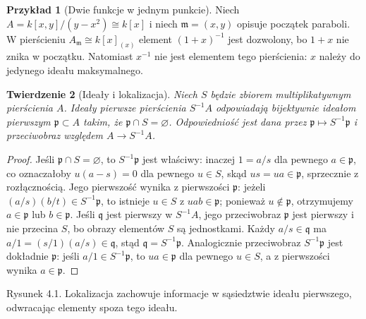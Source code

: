 \documentclass[11pt,a4paper,openany]{report}
\numberwithin{equation}{section}
\theoremstyle{plain}
\newtheorem{twierdzenie}{Twierdzenie}[section]
\theoremstyle{definition}
\newtheorem{przyklad}[twierdzenie]{Przykład}
\theoremstyle{remark}
\begin{document}
\begin{przyklad}[Dwie funkcje w jednym punkcie]
Niech $A=k[x,y]/(y-x^2)\cong k[x]$ i niech
$\mathfrak m=(x,y)$ opisuje początek paraboli.
W pierścieniu $A_{\mathfrak m}\cong k[x]_{(x)}$
element $(1+x)^{-1}$ jest dozwolony, bo $1+x$
nie znika w początku. Natomiast $x^{-1}$
nie jest elementem tego pierścienia: $x$ należy
do jedynego ideału maksymalnego.
\end{przyklad}

\begin{twierdzenie}[Ideały i lokalizacja]
\label{tw:idealy-loc}
Niech $S$ będzie zbiorem multiplikatywnym pierścienia $A$.
Ideały pierwsze pierścienia $S^{-1}A$ odpowiadają
bijektywnie ideałom pierwszym $\mathfrak p\subset A$
takim, że $\mathfrak p\cap S=\varnothing$.
Odpowiedniość jest dana przez
$\mathfrak p\mapsto S^{-1}\mathfrak p$ i przeciwobraz
względem $A\to S^{-1}A$.
\end{twierdzenie}
\begin{proof}
Jeśli $\mathfrak p\cap S=\varnothing$, to
$S^{-1}\mathfrak p$ jest właściwy: inaczej $1=a/s$
dla pewnego $a\in\mathfrak p$, co oznaczałoby
$u(a-s)=0$ dla pewnego $u\in S$, skąd $us=ua\in\mathfrak p$,
sprzecznie z rozłącznością. Jego pierwszość
wynika z pierwszości $\mathfrak p$: jeżeli
$(a/s)(b/t)\in S^{-1}\mathfrak p$, to istnieje
$u\in S$ z $uab\in\mathfrak p$; ponieważ
$u\notin\mathfrak p$, otrzymujemy $a\in\mathfrak p$
lub $b\in\mathfrak p$.
Jeśli $\mathfrak q$ jest pierwszy w $S^{-1}A$,
jego przeciwobraz $\mathfrak p$ jest pierwszy
i nie przecina $S$, bo obrazy elementów $S$ są
jednostkami. Każdy $a/s\in\mathfrak q$ ma
$a/1=(s/1)(a/s)\in\mathfrak q$, stąd
$\mathfrak q=S^{-1}\mathfrak p$. Analogicznie
przeciwobraz $S^{-1}\mathfrak p$ jest dokładnie
$\mathfrak p$: jeśli $a/1\in S^{-1}\mathfrak p$,
to $ua\in\mathfrak p$ dla pewnego $u\in S$,
a z pierwszości wynika $a\in\mathfrak p$.
\end{proof}

\begin{center}

{\small Rysunek 4.1. Lokalizacja zachowuje informacje w sąsiedztwie ideału pierwszego, odwracając elementy spoza tego ideału.}\par
\end{center}
\end{document}
